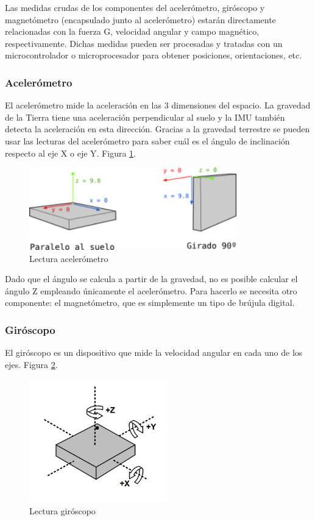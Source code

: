 Las medidas crudas de los componentes del acelerómetro, giróscopo y magnetómetro (encapsulado junto al acelerómetro) estarán directamente relacionadas con la fuerza G, velocidad angular y campo magnético, respectivamente. Dichas medidas pueden ser procesadas y tratadas con un microcontrolador o microprocesador para obtener posiciones, orientaciones, etc.

\subsubsection{Acelerómetro}

El acelerómetro mide la aceleración en las 3 dimensiones del espacio. La gravedad de la Tierra tiene una aceleración perpendicular al suelo y la IMU también detecta la aceleración en esta dirección. Gracias a la gravedad terrestre se pueden usar las lecturas del acelerómetro para saber cuál es el ángulo de inclinación respecto al eje X o eje Y. Figura \ref{fig:ImuAcel}.

\begin{figure}[h]
\centering
\includegraphics[width=90mm]{Figures/imu-acel.png}
\caption[Lectura acelerómetro]{Lectura acelerómetro}
\label{fig:ImuAcel}
\end{figure}

Dado que el ángulo se calcula a partir de la gravedad, no es posible calcular el ángulo Z empleando únicamente el acelerómetro. Para hacerlo se necesita otro componente: el magnetómetro, que es simplemente un tipo de brújula digital.

\subsubsection{Giróscopo}

El giróscopo es un dispositivo que mide la velocidad angular en cada uno de los ejes. Figura \ref{fig:ImuGiro}.

\begin{figure}[h]
\centering
\includegraphics[width=60mm]{Figures/imus-giro.jpg}
\caption[Lectura giróscopo]{Lectura giróscopo}
\label{fig:ImuGiro}
\end{figure}

